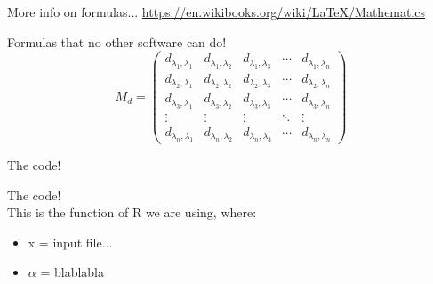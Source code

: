 \documentclass{beamer}
\begin{document}
\begin{frame}{More info on formulas...}
\url{https://en.wikibooks.org/wiki/LaTeX/Mathematics}
\end{frame}

\begin{frame}{Formulas that no other software can do!}
    \begin{equation}
    M_d=
    \begin{pmatrix}
    d_{\lambda_1,\lambda_1} & d_{\lambda_1,\lambda_2} & d_{\lambda_1,\lambda_3} & \cdots & d_{\lambda_1,\lambda_n} \\
    d_{\lambda_2,\lambda_1} & d_{\lambda_2,\lambda_2} & d_{\lambda_2,\lambda_3} & \cdots & d_{\lambda_2,\lambda_n} \\
    d_{\lambda_3,\lambda_1} & d_{\lambda_3,\lambda_2} & d_{\lambda_3,\lambda_3} & \cdots & d_{\lambda_3,\lambda_n} \\
    \vdots  & \vdots  & \vdots  & \ddots & \vdots  \\
    d_{\lambda_n,\lambda_1} & d_{\lambda_n,\lambda_2} & d_{\lambda_n,\lambda_3} & \cdots & d_{\lambda_n,\lambda_n}
    \end{pmatrix}
    \end{equation}
\end{frame}

\begin{frame}{The code!}
    
\end{frame}

\begin{frame}{The code!}
     \\
    \bigskip
    This is the function of R we are using, where:
    \begin{itemize}
        \item x = input file...
        \item $\alpha$ = blablabla
    \end{itemize}
\end{frame}


 
\end{document}
